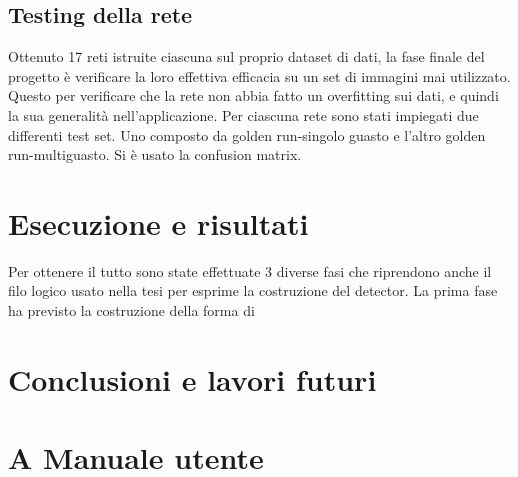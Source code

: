 \documentclass[14pt]{extarticle}
\begin{document}
\subsection{Testing della rete}
Ottenuto 17 reti istruite ciascuna sul proprio dataset di dati, la fase finale del progetto è verificare la loro effettiva efficacia su un set di immagini mai utilizzato. Questo per verificare che la rete non abbia fatto un overfitting sui dati, e quindi la sua  generalità nell'applicazione.
Per ciascuna rete sono stati impiegati due differenti test set. Uno composto da golden run-singolo guasto e l'altro golden run-multiguasto. 
Si è usato la confusion matrix.

\section{Esecuzione e risultati}
Per ottenere il tutto sono state effettuate 3 diverse fasi che riprendono anche il filo logico usato nella tesi per esprime la costruzione del detector.
La prima fase ha previsto la costruzione della forma di
\section{Conclusioni e lavori futuri}

\section{A Manuale utente}\label{sect:manuale utente}

\newpage
\printbibliography
\end{document}
